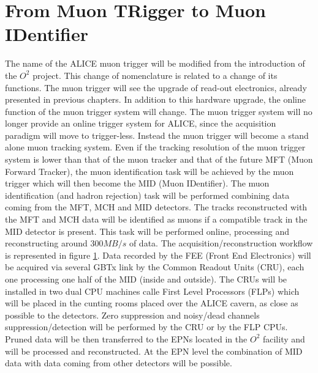 \section{From Muon TRigger to Muon IDentifier}
The name of the ALICE muon trigger will be modified from the introduction of the $O^2$ project.
This change of nomenclature is related to a change of its functions.
The muon trigger will see the upgrade of read-out electronics, already presented in previous chapters.
In addition to this hardware upgrade, the online function of the muon trigger system will change.
The muon trigger system will no longer provide an online trigger system for ALICE, since the acquisition paradigm will move to trigger-less.
Instead the muon trigger will become a stand alone muon tracking system.
Even if the tracking resolution of the muon trigger system is lower than that of the muon tracker and that of the future MFT (Muon Forward Tracker), the muon identification task will be achieved by the muon trigger which will then become the MID (Muon IDentifier).
The muon identification (and hadron rejection) task will be performed combining data coming from the MFT, MCH and MID detectors.
The tracks reconstructed with the MFT and MCH data will be identified as muons if a compatible track in the MID detector is present.
This task will be performed online, processing and reconstructing around $300 MB/s$ of data.
The acquisition/reconstruction workflow is represented in figure \ref{}.
Data recorded by the FEE (Front End Electronics) will be acquired via several GBTx link by the Common Readout Units (CRU), each one processing one half of the MID (inside and outside).
The CRUs will be installed in two dual CPU machines calle First Level Processors (FLPs) which will be placed in the cunting rooms placed over the ALICE cavern, as close as possible to the detectors.
Zero suppression and noisy/dead channels suppression/detection will be performed by the CRU or by the FLP CPUs.
Pruned data will be then transferred to the EPNs located in the $O^2$ facility and will be processed and reconstructed.
At the EPN level the combination of MID data with data coming from other detectors will be possible.